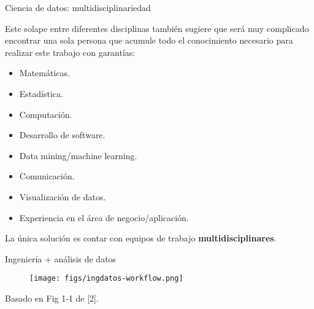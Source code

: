 
\begin{frame}{Ciencia de datos: multidisciplinariedad}
 \begin{wideitemize}
  \item Este solape entre diferentes disciplinas también sugiere que será muy
  complicado encontrar una sola persona que acumule todo el conocimiento necesario
  para realizar este trabajo con garantías:
  \begin{itemize}
   \item Matemáticas.
   \item Estadística.
   \item Computación.
   \item Desarrollo de software.
   \item Data mining/machine learning.
   \item Comunicación.
   \item Visualización de datos.
   \item Experiencia en el área de negocio/aplicación.
  \end{itemize}

  \item La única solución es contar con equipos de trabajo \textbf{multidisciplinares}.

 \end{wideitemize}

\end{frame}


\begin{frame}{Ingeniería + análisis de datos}
 \begin{figure}
\centering
\texttt{[image: figs/ingdatos-workflow.png]} 
\end{figure}
Basado en Fig 1-1 de [2].

\end{frame}



